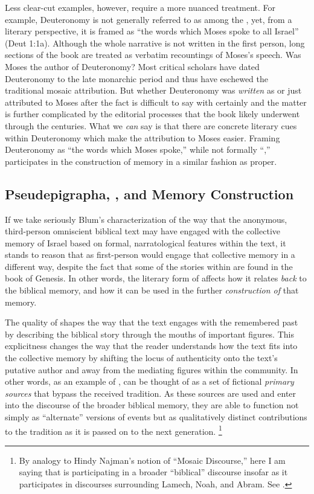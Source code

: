 Less clear-cut examples, however, require a more nuanced treatment. For example, Deuteronomy is not generally referred to as among the \psa, yet, from a literary perspective, it is framed as  ``the words which Moses spoke to all Israel'' (Deut 1:1a). Although the whole narrative is not written in the first person, long sections of the book are treated as verbatim recountings of Moses's speech. Was Moses the author of Deuteronomy? Most critical scholars have dated Deuteronomy to the late monarchic period and thus have eschewed the traditional mosaic attribution. But whether Deuteronomy was \emph{written} as \psa or just attributed to Moses after the fact is difficult to say with certainly and the matter is further complicated by the editorial processes that the book likely underwent through the centuries.%
    \autocite[143--172]{toorn2007}
What we \emph{can} say is that there are concrete literary cues within Deuteronomy which make the attribution to Moses easier. Framing Deuteronomy as ``the words which Moses spoke,'' while not formally ``\psa,'' participates in the construction of memory in a similar fashion as \psa proper.

\subsection{Pseudepigrapha, \ga, and Memory Construction}

If we take seriously Blum's characterization of the way that the anonymous, third-person omniscient biblical text may have engaged with the collective memory of Israel based on formal, narratological features within the text, it stands to reason that \ga as first-person \psy would engage that collective memory in a different way, despite the fact that some of the stories within \ga are found in the book of Genesis. In other words, the literary form of \ga affects how it relates \emph{back} to the biblical memory, and how it can be used in the further \emph{construction of} that memory.

The \psgraphic quality of \ga shapes the way that the text engages with the remembered past by describing the biblical story through the mouths of important figures. This explicitness changes the way that the reader understands how the text fits into the collective memory by shifting the locus of authenticity onto the text's putative author and away from the mediating figures within the community. In other words, as an example of \psy, \ga can be thought of as a set of fictional \emph{primary sources} that bypass the received tradition. As these sources are used and enter into the discourse of the broader biblical memory, they are able to function not simply as ``alternate'' versions of events but as qualitatively distinct contributions to the tradition as it is passed on to the next generation.%
    \footnote{By analogy to Hindy Najman's notion of ``Mosaic Discourse,'' here I am saying that \ga is participating in a broader ``biblical'' discourse insofar as it participates in discourses surrounding Lamech, Noah, and Abram. See \cite[1--40]{najman2003}.}

